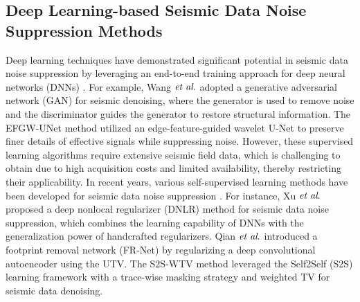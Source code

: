 \subsection{Deep Learning-based Seismic Data Noise Suppression Methods}

Deep learning techniques have demonstrated significant potential in seismic data noise suppression \cite{zhu2019seismic,wang2020generative,wang2024efgw,wang2022learning,xu2023deep,qian2023unsupervised,xu2023s2s} by leveraging an end-to-end training approach for deep neural networks (DNNs) \cite{lecun2015deep}. For example, Wang $\emph{et al}.$ \cite{wang2020generative} adopted a generative adversarial network (GAN) \cite{goodfellow2020generative} for seismic denoising, where the generator is used to remove noise and the discriminator guides the generator to restore structural information. The EFGW-UNet method \cite{wang2024efgw} utilized an edge-feature-guided wavelet U-Net \cite{ronneberger2015u} to preserve finer details of effective signals while suppressing noise. However, these supervised learning algorithms \cite{liu2021unsupervised,qiu2021deep} require extensive seismic field data, which is challenging to obtain due to high acquisition costs and limited availability, thereby restricting their applicability. In recent years, various self-supervised learning methods have been developed for seismic data noise suppression \cite{meng2021self,xu2023deep,qian2023unsupervised,xu2023s2s}. For instance, Xu $\emph{et al}.$ \cite{xu2023deep} proposed a deep nonlocal regularizer (DNLR) method for seismic data noise suppression, which combines the learning capability of DNNs with the generalization power of handcrafted regularizers. Qian $\emph{et al}.$ \cite{qian2023unsupervised} introduced a footprint removal network (FR-Net) by regularizing a deep convolutional autoencoder using the UTV. The S2S-WTV method \cite{xu2023s2s} leveraged the Self2Self (S2S) learning framework \cite{quan2020self2self} with a trace-wise masking strategy and weighted TV for seismic data denoising.
